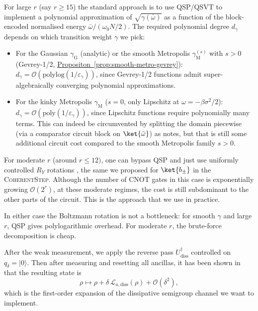 For large $r$ (say $r \geq 15$) the standard approach is to use QSP/QSVT \cite{gilyen2019quantum} to implement a polynomial approximation of $\sqrt{\gamma(\bar{\omega})}$ as a function of the block-encoded normalised energy $\bar\omega / (\omega_0 N/2)$. The required polynomial degree $d_\gamma$ depends on which transition weight $\gamma$ we pick:
\begin{itemize}
    \item For the Gaussian $\gamma_\mathrm{G}$ (analytic) or the smooth Metropolis $\gamma_\mathrm{M}^{(s)}$ with $s>0$ (Gevrey-1/2, \hyperref[prop:smooth-metro-gevrey]{Propositon~\ref*{prop:smooth-metro-gevrey}}): $d_\gamma = \mathcal{O}(\mathrm{polylog}(1/\varepsilon_\gamma))$, since Gevrey-1/2 functions admit super-algebraically converging polynomial approximations.
    \item For the kinky Metropolis $\gamma_\mathrm{M}$ ($s = 0$, only Lipschitz at $\omega = -\beta\sigma^2 / 2$): $d_\gamma = \mathcal{O}(\mathrm{poly}(1/\varepsilon_\gamma))$, since Lipschitz functions require polynomially many terms. This can indeed be circumvented by splitting the domain piecewise (via a comparator circuit block on $\ket{\bar{\omega}}$) as \cite{chen2023quantum} notes, but that is still some additional circuit cost compared to the smooth Metropolis family $s>0$.
\end{itemize}

For moderate $r$ (around $r \leq 12)$, one can bypass QSP and just use uniformly controlled $R_Y$ rotations \cite{mottonen2004transformation,shende2008cnot}, the same we proposed for $\ket{b_\pm}$ in the \textsc{CoherentStep}. Although the number of CNOT gates in this case is exponentially growing $\mathcal{O}(2^r)$, at these moderate regimes, the cost is still subdominant to the other parts of the circuit. This is the approach that we use in practice. 

In either case the Boltzmann rotation is not a bottleneck: for smooth $\gamma$ and large $r$, QSP gives polylogarithmic overhead. For moderate $r$, the brute-force decomposition is cheap. 

After the weak measurement, we apply the reverse pass $U_{\mathrm{diss}}^\dagger$ controlled on $q_\delta = |0\rangle$. Then after measuring and resetting all ancillas, it has been shown in \cite[Theorem III.1]{chen2023quantum} that the resulting state is 
$$
\rho \mapsto \rho + \delta\,\mathcal{L}_{a,\mathrm{diss}}(\rho) + \mathcal{O}(\delta^2),
$$
which is the first-order expansion of the dissipative semigroup channel we want to implement. 

